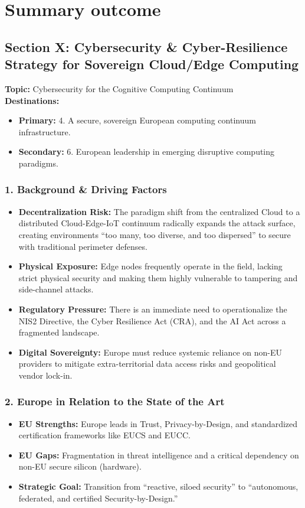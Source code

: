 \documentclass[12pt,a4paper]{report}
\begin{document}
\chapter{Summary outcome}
\section{Section X: Cybersecurity \& Cyber-Resilience Strategy for Sovereign Cloud/Edge Computing}
\noindent\textbf{Topic:} Cybersecurity for the Cognitive Computing Continuum \\
\textbf{Destinations:}
\begin{itemize}[noitemsep]
    \item \textbf{Primary:} 4. A secure, sovereign European computing continuum infrastructure.
    \item \textbf{Secondary:} 6. European leadership in emerging disruptive computing paradigms.
\end{itemize}

\subsection{1. Background \& Driving Factors}
\begin{itemize}
    \item \textbf{Decentralization Risk:} The paradigm shift from the centralized Cloud to a distributed Cloud-Edge-IoT continuum radically expands the attack surface, creating environments ``too many, too diverse, and too dispersed'' to secure with traditional perimeter defenses.
    \item \textbf{Physical Exposure:} Edge nodes frequently operate in the field, lacking strict physical security and making them highly vulnerable to tampering and side-channel attacks.
    \item \textbf{Regulatory Pressure:} There is an immediate need to operationalize the NIS2 Directive, the Cyber Resilience Act (CRA), and the AI Act across a fragmented landscape.
    \item \textbf{Digital Sovereignty:} Europe must reduce systemic reliance on non-EU providers to mitigate extra-territorial data access risks and geopolitical vendor lock-in.
\end{itemize}

\subsection{2. Europe in Relation to the State of the Art}
\begin{itemize}
    \item \textbf{EU Strengths:} Europe leads in Trust, Privacy-by-Design, and standardized certification frameworks like EUCS and EUCC.
    \item \textbf{EU Gaps:} Fragmentation in threat intelligence and a critical dependency on non-EU secure silicon (hardware).
    \item \textbf{Strategic Goal:} Transition from ``reactive, siloed security'' to ``autonomous, federated, and certified Security-by-Design.''
\end{itemize}
\end{document}
